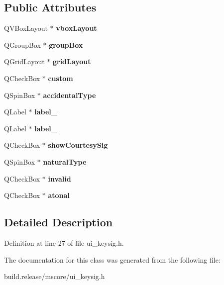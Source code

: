 \subsection*{Public Attributes}
\begin{DoxyCompactItemize}
\item 
\mbox{\label{class_ui___key_sig_a0988eb4ba7752f4752e1ded2139652ad}} 
Q\+V\+Box\+Layout $\ast$ {\bfseries vbox\+Layout}
\item 
\mbox{\label{class_ui___key_sig_ab0676ebb14133a690fa01ae70ea3a462}} 
Q\+Group\+Box $\ast$ {\bfseries group\+Box}
\item 
\mbox{\label{class_ui___key_sig_a881351b5e37dec086bf0151f5bf98871}} 
Q\+Grid\+Layout $\ast$ {\bfseries grid\+Layout}
\item 
\mbox{\label{class_ui___key_sig_a3e8d246611a737e24d5308bf6a2f9f24}} 
Q\+Check\+Box $\ast$ {\bfseries custom}
\item 
\mbox{\label{class_ui___key_sig_ac56143f46d223955f36d5dfead4697d0}} 
Q\+Spin\+Box $\ast$ {\bfseries accidental\+Type}
\item 
\mbox{\label{class_ui___key_sig_ac0b2ada943fd1150e54cd714ab866e06}} 
Q\+Label $\ast$ {\bfseries label\+\_}
\item 
\mbox{\label{class_ui___key_sig_ab003977325ab635b928e89eeb0151406}} 
Q\+Label $\ast$ {\bfseries label\+\_}
\item 
\mbox{\label{class_ui___key_sig_a3a708033cb51734cac7bd497a6518bb8}} 
Q\+Check\+Box $\ast$ {\bfseries show\+Courtesy\+Sig}
\item 
\mbox{\label{class_ui___key_sig_ad5e6b6736e3bbdbedaf0c98bbe535568}} 
Q\+Spin\+Box $\ast$ {\bfseries natural\+Type}
\item 
\mbox{\label{class_ui___key_sig_a9b6c603e0cda28a8977c70c3d19d6c21}} 
Q\+Check\+Box $\ast$ {\bfseries invalid}
\item 
\mbox{\label{class_ui___key_sig_acb778d8869535bc25507ce06d9c398cd}} 
Q\+Check\+Box $\ast$ {\bfseries atonal}
\end{DoxyCompactItemize}


\subsection{Detailed Description}


Definition at line 27 of file ui\+\_\+keysig.\+h.



The documentation for this class was generated from the following file\+:\begin{DoxyCompactItemize}
\item 
build.\+release/mscore/ui\+\_\+keysig.\+h\end{DoxyCompactItemize}
